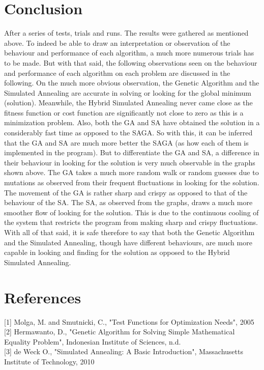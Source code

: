 \documentclass{article}
\begin{document}
\section{Conclusion}
After a series of tests, trials and runs. The results were gathered as mentioned above. To indeed be able to draw an interpretation or observation of the behaviour and performance of each algorithm, a much more numerous trials has to be made. But with that said, the following observations seen on the behaviour and performance of each algorithm on each problem are discussed in the following. On the much more obvious observation, the Genetic Algorithm and the Simulated Annealing are accurate in solving or looking for the global minimum (solution). Meanwhile, the Hybrid Simulated Annealing never came close as the fitness function or cost function are significantly not close to zero as this is a minimization problem. Also, both the GA and SA have obtained the solution in a considerably fast time as opposed to the SAGA. So with this, it can be inferred that the GA and SA are much more better the SAGA (as how each of them is implemented in the program). But to differentiate the GA and SA, a difference in their behaviour in looking for the solution is very much observable in the graphs shown above. The GA takes a much more random walk or random guesses due to mutations as observed from their frequent fluctuations in looking for the solution. The movement of the GA is rather sharp and crispy as opposed to that of the behaviour of the SA. The SA, as observed from the graphs, draws a much more smoother flow of looking for the solution. This is due to the continuous cooling of the system that restricts the program from making sharp and crispy fluctuations. With all of that said, it is safe therefore to say that both the Genetic Algorithm and the Simulated Annealing, though have different behaviours, are much more capable in looking and finding for the solution as opposed to the Hybrid Simulated Annealing.

\section{References}
[1] Molga, M. and Smutnicki, C., "Test Functions for Optimization Needs", 2005
\\

[2] Hermawanto, D., "Genetic Algorithm for Solving Simple Mathematical Equality Problem", Indonesian Institute of Sciences, n.d.
\\

[3] de Weck O.,  "Simulated Annealing: A Basic Introduction", Massachusetts Institute of Technology, 2010 
\end{document}
